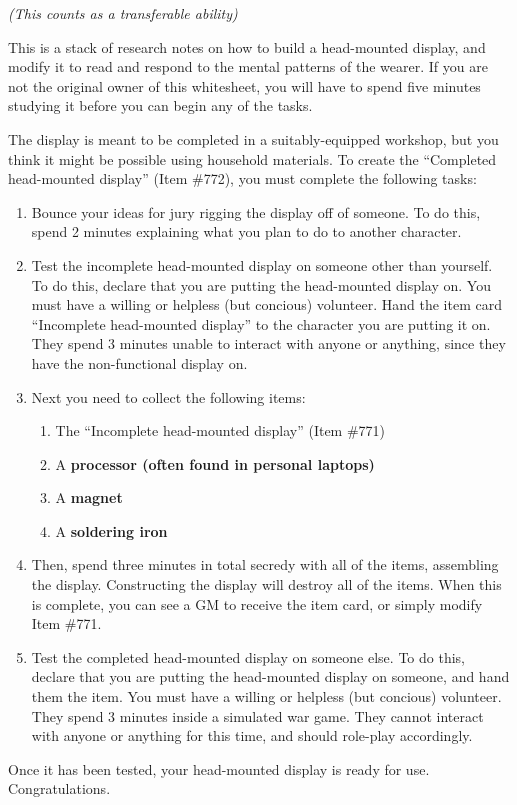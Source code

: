 \documentclass[white]{guildcamp1}
\begin{document}
\name{\wHeadMountedDisplay{}}

\emph{(This counts as a transferable ability)}

This is a stack of research notes on how to build a head-mounted display, and modify it to read and respond to the mental patterns of the wearer. If you are not the original owner of this whitesheet, you will have to spend five minutes studying it before you can begin any of the tasks.

The display is meant to be completed in a suitably-equipped workshop, but you think it might be possible using household materials. To create the ``Completed head-mounted display'' (Item \#772), you must complete the following tasks:

\begin{enumerate}
\item Bounce your ideas for jury rigging the display off of someone. To do this, spend 2 minutes explaining what you plan to do to another character.
\item Test the incomplete head-mounted display on someone other than yourself. To do this, declare that you are putting the head-mounted display on. You must have a willing or helpless (but concious) volunteer. Hand the item card ``Incomplete head-mounted display'' to the character you are putting it on. They spend 3 minutes unable to interact with anyone or anything, since they have the non-functional display on.
\item  Next you need to collect the following items:
\begin{enumerate}
\item The  ``Incomplete head-mounted display'' (Item \#771)
\item A \bf{processor} (often found in personal laptops)
\item A \bf{magnet}
\item A \bf{soldering iron}
\end{enumerate}
\item Then, spend three minutes in total secredy with all of the items, assembling the display. Constructing the display will destroy all of the items.  When this is complete, you can see a GM to receive the item card, or simply modify Item \#771.
\item Test the completed head-mounted display on someone else. To do this, declare that you are putting the head-mounted display on someone, and hand them the item. You must have a willing or helpless (but concious) volunteer. They spend 3 minutes inside a simulated war game. They cannot interact with anyone or anything for this time, and should role-play accordingly.
\end{enumerate}

Once it has been tested, your head-mounted display is ready for use. Congratulations.
\end{document}
